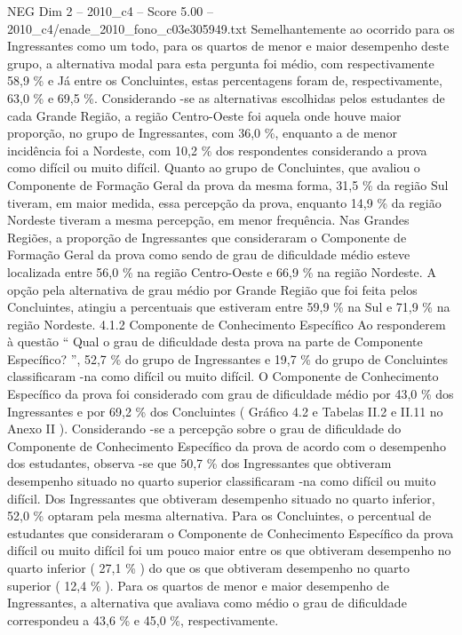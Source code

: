 \begin{textsample}{NEG Dim 2 – 2010\_c4 – Score 5.00 – 2010\_c4/enade\_2010\_fono\_c03e305949.txt}
Semelhantemente ao ocorrido para os Ingressantes como um todo, para os quartos de menor e maior desempenho deste grupo, a alternativa modal para esta pergunta foi médio, com respectivamente 58,9 \% e Já entre os Concluintes, estas percentagens foram de, respectivamente, 63,0 \% e 69,5 \%.
Considerando -se as alternativas escolhidas pelos estudantes de cada Grande Região, a região Centro-Oeste foi aquela onde houve maior proporção, no grupo de Ingressantes, com 36,0 \%, enquanto a de menor incidência foi a Nordeste, com 10,2 \% dos respondentes considerando a prova como difícil ou muito difícil.
Quanto ao grupo de Concluintes, que avaliou o Componente de Formação Geral da prova da mesma forma, 31,5 \% da região Sul tiveram, em maior medida, essa percepção da prova, enquanto 14,9 \% da região Nordeste tiveram a mesma percepção, em menor frequência.
Nas Grandes Regiões, a proporção de Ingressantes que consideraram o Componente de Formação Geral da prova como sendo de grau de dificuldade médio esteve localizada entre 56,0 \% na região Centro-Oeste e 66,9 \% na região Nordeste.
A opção pela alternativa de grau médio por Grande Região que foi feita pelos Concluintes, atingiu a percentuais que estiveram entre 59,9 \% na Sul e 71,9 \% na região Nordeste. 4.1.2 Componente de Conhecimento Específico Ao responderem à questão “ Qual o grau de dificuldade desta prova na parte de Componente Específico? ”, 52,7 \% do grupo de Ingressantes e 19,7 \% do grupo de Concluintes classificaram -na como difícil ou muito difícil.
O Componente de Conhecimento Específico da prova foi considerado com grau de dificuldade médio por 43,0 \% dos Ingressantes e por 69,2 \% dos Concluintes ( Gráfico 4.2 e Tabelas II.2 e II.11 no Anexo II ).
Considerando -se a percepção sobre o grau de dificuldade do Componente de Conhecimento Específico da prova de acordo com o desempenho dos estudantes, observa -se que 50,7 \% dos Ingressantes que obtiveram desempenho situado no quarto superior classificaram -na como difícil ou muito difícil.
Dos Ingressantes que obtiveram desempenho situado no quarto inferior, 52,0 \% optaram pela mesma alternativa.
Para os Concluintes, o percentual de estudantes que consideraram o Componente de Conhecimento Específico da prova difícil ou muito difícil foi um pouco maior entre os que obtiveram desempenho no quarto inferior ( 27,1 \% ) do que os que obtiveram desempenho no quarto superior ( 12,4 \% ).
Para os quartos de menor e maior desempenho de Ingressantes, a alternativa que avaliava como médio o grau de dificuldade correspondeu a 43,6 \% e 45,0 \%, respectivamente.

\end{textsample}
